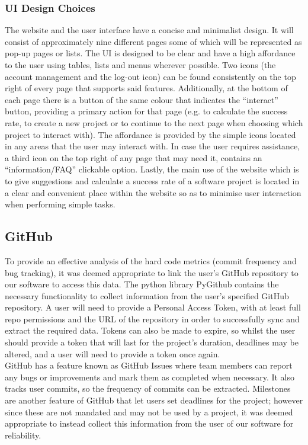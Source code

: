 \documentclass[a4paper]{article}
\theoremstyle{plain}
\theoremstyle{definition}
\theoremstyle{remark}
\begin{document}
\subsubsection*{UI Design Choices}
The website and the user interface have a concise and minimalist design. It will consist of approximately nine different pages some of which will be represented as pop-up pages or lists. The UI is designed to be clear and have a high affordance to the user using tables, lists and menus wherever possible. Two icons (the account management and the log-out icon) can be found consistently on the top right of every page that supports said features. Additionally, at the bottom of each page there is a button of the same colour that indicates the “interact” button, providing a primary action for that page (e.g. to calculate the success rate, to create a new project or to continue to the next page when choosing which project to interact with). The affordance is provided by the simple icons located in any areas that the user may interact with. In case the user requires assistance, a third icon on the top right of any page that may need it, contains an “information/FAQ” clickable option. Lastly, the main use of the website which is to give suggestions and calculate a success rate of a software project is located in a clear and convenient place within the website so as to minimise user interaction when performing simple tasks.
\subsection*{GitHub}
To provide an effective analysis of the hard code metrics (commit frequency and bug tracking), it was deemed appropriate to link the user’s GitHub repository to our software to access this data. The python library PyGithub contains the necessary functionality to collect information from the user’s specified GitHub repository. A user will need to provide a Personal Access Token, with at least full repo permissions and the URL of the repository in order to successfully sync and extract the required data. Tokens can also be made to expire, so whilst the user should provide a token that will last for the project's duration, deadlines may be altered, and a user will need to provide a token once again.\\

\noindent GitHub has a feature known as GitHub Issues where team members can report any bugs or improvements and mark them as completed when necessary. It also tracks user commits, so the frequency of commits can be extracted. Milestones are another feature of GitHub that let users set deadlines for the project; however since these are not mandated and may not be used by a project, it was deemed appropriate to instead collect this information from the user of our software for reliability.
\end{document}
